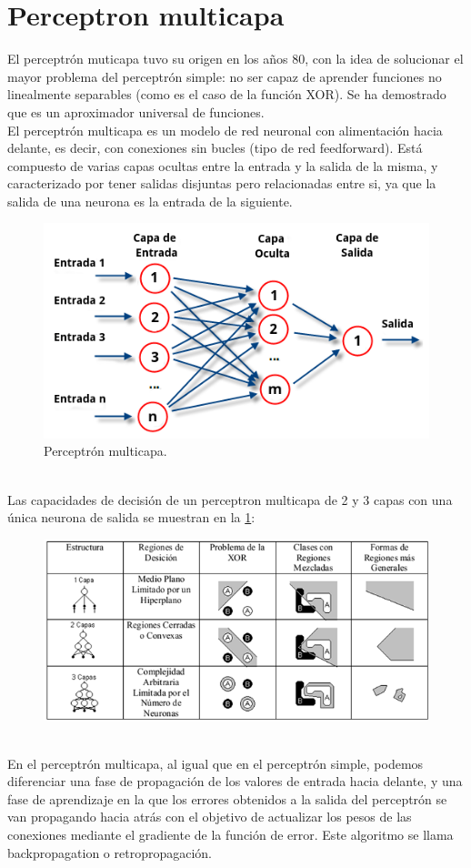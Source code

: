 \section {Perceptron multicapa}
El perceptrón muticapa tuvo su origen en los años 80, con la idea de solucionar el mayor problema del perceptrón simple: no ser capaz de aprender funciones no linealmente separables (como es el caso de la función XOR). Se ha demostrado que es un aproximador universal de funciones.
\\El perceptrón multicapa es un modelo de red neuronal con alimentación hacia delante, es decir, con conexiones sin bucles (tipo de red feedforward). Está compuesto de varias capas ocultas entre la entrada y la salida de la misma, y caracterizado por tener salidas disjuntas pero relacionadas entre si, ya que la salida de una neurona es la entrada de la siguiente.
\begin{figure}[htp]
\centering
\includegraphics[scale=1.2]{images/multilayerperceptron.png}
\caption{Perceptrón multicapa.}
\end{figure}
\\Las capacidades de decisión de un perceptron multicapa de 2 y 3 capas con una única neurona de salida se muestran en la \ref{perceptron23capas}:
\begin{figure}[htp]
\centering
\includegraphics[scale=0.7]{images/perceptron23capas.png}
\label{perceptron23capas}
\end{figure}
\\En el perceptrón multicapa, al igual que en el perceptrón simple, podemos diferenciar una fase de propagación de los valores de entrada hacia delante, y una fase de aprendizaje en la que los errores obtenidos a la salida del perceptrón se van propagando hacia atrás con el objetivo de actualizar los pesos de las conexiones mediante el gradiente de la función de error. Este algoritmo se llama backpropagation o retropropagación.
